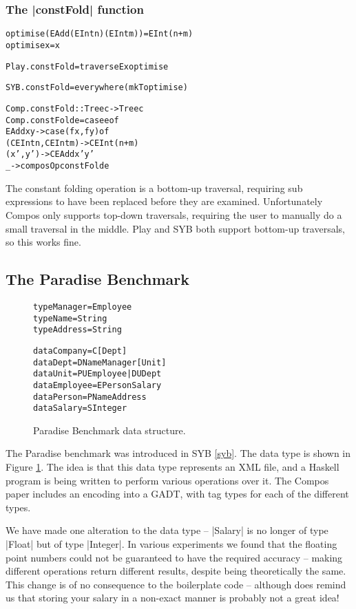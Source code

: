 \documentclass[preprint]{sigplanconf}
\newenvironment{code}{\begin{alltt}\small}{\end{alltt}}
\begin{document}
\subsubsection{The |constFold| function}

\begin{code}
optimise (EAdd (EInt n) (EInt m)) = EInt (n+m)
optimise x = x

Play.constFold = traverseEx optimise

SYB.constFold = everywhere (mkT optimise)

Comp.constFold :: Tree c -> Tree c
Comp.constFold e = case e of
    EAdd x y -> case  (f x, f y) of
                      (CEInt n, CEInt m) -> CEInt (n+m)
                      (x',y') -> CEAdd x' y'
    _ -> composOp constFold e
\end{code}

The constant folding operation is a bottom-up traversal, requiring sub expressions to have been replaced before they are examined. Unfortunately Compos only supports top-down traversals, requiring the user to manually do a small traversal in the middle. Play and SYB both support bottom-up traversals, so this works fine.


\subsection{The Paradise Benchmark}

\begin{figure}
\begin{code}
type Manager  = Employee
type Name     = String
type Address  = String

data Company   = C [Dept]
data Dept      = D Name Manager [Unit]
data Unit      = PU Employee | DU Dept
data Employee  = E Person Salary
data Person    = P Name Address
data Salary    = S Integer
\end{code}
\caption{Paradise Benchmark data structure.}
\label{fig:paradise}
\end{figure}

The Paradise benchmark was introduced in SYB \ref{syb}. The data type is shown in Figure \ref{fig:paradise}. The idea is that this data type represents an XML file, and a Haskell program is being written to perform various operations over it. The Compos paper includes an encoding into a GADT, with tag types for each of the different types.

We have made one alteration to the data type -- |Salary| is no longer of type |Float| but of type |Integer|. In various experiments we found that the floating point numbers could not be guaranteed to have the required accuracy -- making different operations return different results, despite being theoretically the same. This change is of no consequence to the boilerplate code -- although does remind us that storing your salary in a non-exact manner is probably not a great idea!
\end{document}
